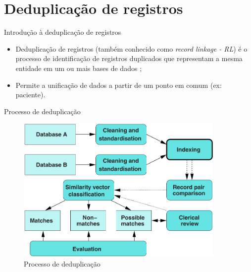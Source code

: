 \documentclass{beamer}
\begin{document}
  \section{Deduplicação de registros}

  \begin{frame}{Introdução à deduplicação de registros}
      \begin{itemize}
          \item Deduplicação de registros (também conhecido como \textit{record linkage - RL}) é o processo de identificação de registros duplicados que representam a mesma entidade em um ou mais bases de dados \cite{survey};
          \item Permite a unificação de dados a partir de um ponto em comum (ex: paciente).
      \end{itemize}
  \end{frame}

  \begin{frame}{Processo de deduplicação}
      \begin{figure}
          \centering
          \includegraphics[width=0.9\textwidth]{rlprocess.png}
          \caption{Processo de deduplicação \cite{survey}}
      \end{figure}
  \end{frame}
\end{document}
